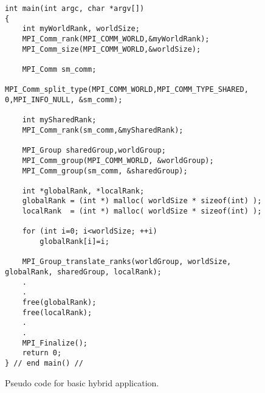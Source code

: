\begin{figure} [t!]
\centering
\captionsetup{justification=centering, singlelinecheck=false}
\begin{lstlisting}[style=CStyle]
int main(int argc, char *argv[])
{
    int myWorldRank, worldSize;
    MPI_Comm_rank(MPI_COMM_WORLD,&myWorldRank);
    MPI_Comm_size(MPI_COMM_WORLD,&worldSize);
    
    MPI_Comm sm_comm;
    MPI_Comm_split_type(MPI_COMM_WORLD,MPI_COMM_TYPE_SHARED, 0,MPI_INFO_NULL, &sm_comm);

    int mySharedRank;
    MPI_Comm_rank(sm_comm,&mySharedRank);

    MPI_Group sharedGroup,worldGroup;
    MPI_Comm_group(MPI_COMM_WORLD, &worldGroup);
    MPI_Comm_group(sm_comm, &sharedGroup);
    
    int *globalRank, *localRank;
    globalRank = (int *) malloc( worldSize * sizeof(int) );
    localRank  = (int *) malloc( worldSize * sizeof(int) );
    
    for (int i=0; i<worldSize; ++i) 
        globalRank[i]=i;

    MPI_Group_translate_ranks(worldGroup, worldSize, globalRank, sharedGroup, localRank);
    .
    .
    free(globalRank);
    free(localRank);
    .
    .
    MPI_Finalize();
    return 0;
} // end main() //
\end{lstlisting}    
\caption{Pseudo code for basic hybrid application.}
\label{fig:PseudoCode2}
\end{figure}

